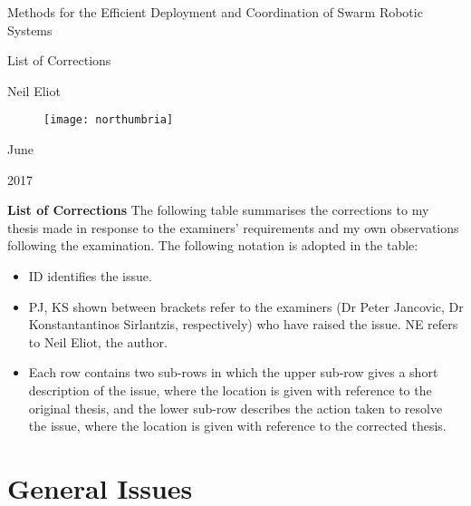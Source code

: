 \documentclass[a4paper,11pt,nocenter,bold,notitlepage,noheadline,noindent]{report}
\newcommand{\theauthor}{Neil Eliot}
\newcommand{\thetitle}{Methods for the Efficient Deployment and Coordination of Swarm Robotic Systems}
\newcommand{\themonth}{June}
\newcommand{\theyear}{2017}
\begin{document}
\setcounter{section}{0}
\setcounter{chapter}{1}
\begin{Huge}
\bfseries
\begin{center}
\thetitle
\end{center}
\begin{center}
List of Corrections
\end{center}
\begin{center}
\theauthor
\end{center}
\begin{figure}[H]
\begin{center}
\texttt{[image: northumbria]}
\end{center}
\end{figure}
\begin{center}
\themonth
\end{center}
\begin{center}
\theyear
\end{center}
\end{Huge}
\newpage

\noindent\LARGE{\textbf{List of Corrections}}\newline\newline
\large
The following table summarises the corrections to my thesis made in response
to the examiners' requirements and my own observations following the examination. The
following notation is adopted in the table:

\begin{itemize}

  \item ID identifies the issue.

  \item PJ, KS shown between brackets refer to the examiners (Dr Peter
    Jancovic, Dr Konstantantinos Sirlantzis, respectively) who have raised the issue.
    NE refers to Neil Eliot, the author.

  \item Each row contains two sub-rows in which the upper sub-row
    gives a short description of the issue, where the location is
    given with reference to the original thesis, and the lower sub-row
    describes the action taken to resolve the issue, where the location
    is given with reference to the corrected thesis.

\end{itemize}

\section{General Issues}
\end{document}
